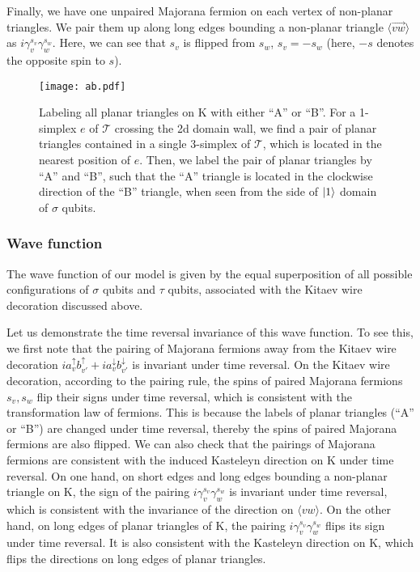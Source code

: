 \documentclass[12pt]{article}
\numberwithin{equation}{section}
\begin{document}
Finally, we have one unpaired Majorana fermion on each vertex of non-planar triangles. We pair them up along long edges bounding a non-planar triangle $\langle \overrightarrow{vw}\rangle$ as $i\gamma_v^{s_v}\gamma_{w}^{s_w}$. Here, we can see that $s_v$ is flipped from $s_w$, $s_v=-s_w$ (here, $-s$ denotes the opposite spin to $s$).

\begin{figure}[htb]
\centering
\texttt{[image: ab.pdf]}
\caption{
Labeling all planar triangles on $\mathrm{K}$ with either ``A'' or ``B''. For a 1-simplex $e$ of $\mathcal{T}$ crossing the 2d domain wall, we find a pair of planar triangles contained in a single 3-simplex of $\mathcal{T}$, which is located in the nearest position of $e$. 
Then, we label the pair of planar triangles by ``A'' and ``B'', such that the ``A'' triangle is located in the clockwise direction of the ``B'' triangle, when seen from the side of $\ket{1}$ domain of $\sigma$ qubits.}
\label{fig:AB}
\end{figure}

\subsubsection{Wave function}
The wave function of our model is given by the equal superposition of all possible configurations of $\sigma$ qubits and $\tau$ qubits, associated with the Kitaev wire decoration discussed above. 

Let us demonstrate the time reversal invariance of this wave function. To see this, we first note that the pairing of Majorana fermions away from the Kitaev wire decoration $ia_v^{\uparrow}b_{v'}^{\uparrow}+ia_v^{\downarrow}b_{v'}^{\downarrow}$ is invariant under time reversal. On the Kitaev wire decoration, according to the pairing rule, the spins of paired Majorana fermions $s_v, s_w$ flip their signs under time reversal, which is consistent with the transformation law of fermions. This is because the labels of planar triangles (``A'' or ``B'') are changed under time reversal, thereby the spins of paired Majorana fermions are also flipped.
We can also check that the pairings of Majorana fermions are consistent with the induced Kasteleyn direction on $\mathrm{K}$ under time reversal. 
On one hand, on short edges and long edges bounding a non-planar triangle on $\mathrm{K}$, the sign of the pairing $i\gamma_v^{s_v}\gamma_{w}^{s_w}$ is invariant under time reversal, which is consistent with the invariance of the direction on $\langle vw\rangle$. 
On the other hand, on long edges of planar triangles of $\mathrm{K}$, the pairing $i\gamma_v^{s_v}\gamma_{w}^{s_w}$ flips its sign under time reversal. 
It is also consistent with the Kasteleyn direction on $\mathrm{K}$, which flips the directions on long edges of planar triangles.
\end{document}
